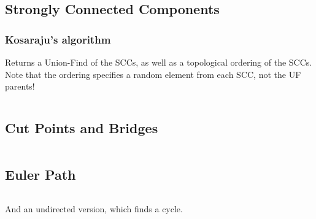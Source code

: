 \documentclass[8pt,a4paper,landscape,oneside]{amsart}
\newcommand{\code}[1]{\inputminted[fontsize=\normalsize,baselinestretch=1]{cpp}{_code/#1}}
\newif\ifverbose
\begin{document}
\begin{multicols*}{3}
    \subsection{Strongly Connected Components}
        \subsubsection{Kosaraju's algorithm}
            \ifverbose
            Kosarajus's algorithm finds strongly connected components of a
            directed graph in $O(|V|+|E|)$ time.
            \fi
            Returns a Union-Find of the SCCs, as well as a topological ordering
            of the SCCs. Note that the ordering specifies a random element from
            each SCC, not the UF parents!
            \code{graph/scc.cpp}

    \subsection{Cut Points and Bridges}
        \code{graph/cut_points_and_bridges.cpp}

    \ifverbose
    \subsection{Minimum Spanning Tree}
        \subsubsection{Kruskal's algorithm}
            \code{graph/kruskals_mst.cpp}
    \fi

    \ifverbose
    \subsection{Topological Sort}
        \subsubsection{Modified Depth-First Search}
            \code{graph/tsort.cpp}
    \fi

    \subsection{Euler Path}
        \ifverbose
        Finds an euler path (or circuit) in a directed graph, or reports that
        none exist.
        \fi
        \code{graph/euler_path.cpp}
        And an undirected version, which finds a cycle.
        \code{graph/euler_path_undirected.cpp}


\end{multicols*}
\end{document}
